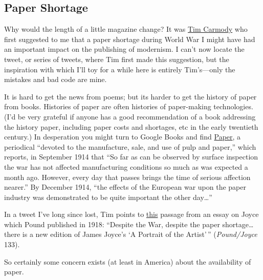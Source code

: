 \documentclass[
  12pt,
]{article}
\begin{document}
\hypertarget{paper-shortage}{%
\subsection{Paper Shortage}\label{paper-shortage}}

Why would the length of a little magazine change? It was
\href{http://twitter.com/tcarmody}{Tim Carmody} who first suggested to
me that a paper shortage during World War I might have had an important
impact on the publishing of modernism. I can't now locate the tweet, or
series of tweets, where Tim first made this suggestion, but the
inspiration with which I'll toy for a while here is entirely
Tim's---only the mistakes and bad code are mine.

It is hard to get the news from poems; but its harder to get the history
of paper from books. Histories of paper are often histories of
paper-making technologies. (I'd be very grateful if anyone has a good
recommendation of a book addressing the history paper, including paper
costs and shortages, etc in the early twentieth century.) In desperation
you might turn to Google Books and find
\href{http://books.google.com/books?id=cP8fAQAAMAAJ}{Paper}, a
periodical ``devoted to the manufacture, sale, and use of pulp and
paper,'' which reports, in September 1914 that ``So far as can be
observed by surface inspection the war has not affected manufacturing
conditions so much as was expected a month ago. However, every day that
passes brings the time of serious affection nearer.'' By December 1914,
``the effects of the European war upon the paper industry was
demonstrated to be quite important the other day\ldots{}''

In a tweet I've long since lost, Tim points to
\href{http://books.google.com/books?id=GZMNYLgd5X4C\&pg=PA133\&lpg=PA133\#v=onepage\&q\&f=false}{this}
passage from an essay on Joyce which Pound published in 1918: ``Despite
the War, despite the paper shortage\ldots{} there is a new edition of
James Joyce's `A Portrait of the Artist'\,'' (\emph{Pound/Joyce} 133).

So certainly some concern exists (at least in America) about the
availability of paper.
\end{document}
